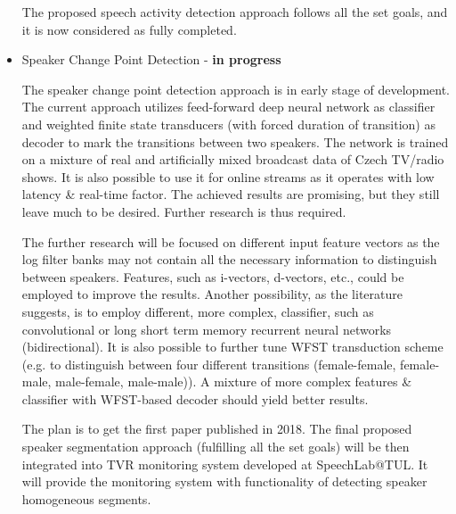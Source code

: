 \documentclass[FM,noheader,EN,bwtitles]{tulthesis}
\begin{document}
\begin{itemize}
	The proposed speech activity detection approach follows all the set goals, and it is now considered as fully completed.
	
	\item Speaker Change Point Detection - \textbf{in progress}
	
	The speaker change point detection approach is in early stage of development.
	The current approach utilizes feed-forward deep neural network as classifier and weighted finite state transducers (with forced duration of transition) as decoder to mark the transitions between two speakers.
	The network is trained on a mixture of real and artificially mixed broadcast data of Czech TV/radio shows.
	It is also possible to use it for online streams as it operates with low latency \& real-time factor.
	The achieved results are promising, but they still leave much to be desired.
	Further research is thus required.
	
	The further research will be focused on different input feature vectors as the log filter banks may not contain all the necessary information to distinguish between speakers.
	Features, such as i-vectors, d-vectors, etc., could be employed to improve the results.
	Another possibility, as the literature suggests, is to employ different, more complex, classifier, such as convolutional or long short term memory recurrent neural networks (bidirectional).
	It is also possible to further tune WFST transduction scheme (e.g. to distinguish between four different transitions (female-female, female-male, male-female, male-male)).
	A mixture of more complex features \& classifier with WFST-based decoder should yield better results.
	
	The plan is to get the first paper published in 2018. 
	The final proposed speaker segmentation approach (fulfilling all the set goals) will be then integrated into TVR monitoring system developed at SpeechLab@TUL.
	It will provide the monitoring system with functionality of detecting speaker homogeneous segments.
		
\end{itemize}	
\end{document}
